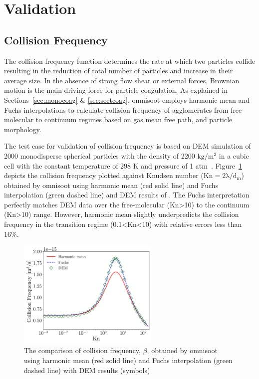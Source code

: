 \section{Validation}

\subsection{Collision Frequency}
The collision frequency function determines the rate at which two particles collide resulting in the reduction of total number of particles and increase in their average size. In the absence of strong flow shear or external forces, Brownian motion is the main driving force for particle coagulation. As explained in Sections~\ref{sec:monocoag} \& \ref{sec:sectcoag}, omnisoot employs harmonic mean and Fuchs interpolations to calculate collision frequency of agglomerates from free-molecular to continuum regimes based on gas mean free path, and particle morphology. 

The test case for validation of collision frequency is based on DEM simulation of 2000 monodisperse spherical particles with the density of 2200 $\mathrm{kg/m^3}$ in
a cubic cell with the constant temperature of 298 K and pressure of 1 atm~\citep{goudeli2015coagulation}. Figure~\ref{fig:kernelvalid} depicts the collision frequency plotted against Knudsen number ($\mathrm{Kn=2\lambda/d_m}$) obtained by omnisoot using harmonic mean (red solid line) and Fuchs interpolation (green dashed line) and DEM results of \citet{goudeli2015coagulation}. The Fuchs interpretation perfectly matches DEM data over the free-molecular (Kn>10) to the continuum (Kn>10) range. However, harmonic mean slightly underpredicts the collision frequency in the transition regime (0.1<Kn<10) with relative errors less than 16\%. 
\begin{figure}[!htbp]
	\centering
	\includegraphics[width=0.6\textwidth]{Figures/Results/Validation/Kernel/kernel_valid.pdf}
	\caption{The comparison of collision frequency, $\beta$, obtained by omnisoot using harmonic mean (red solid line) and Fuchs interpolation (green dashed line) with DEM results (symbols)~\citep{goudeli2015coagulation}}
	\label{fig:kernelvalid}
\end{figure} 


